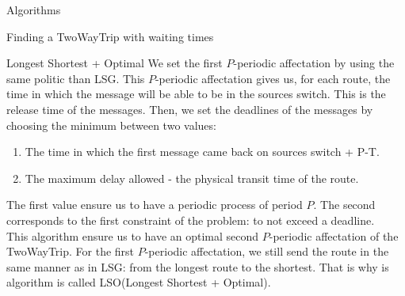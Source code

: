 \documentclass[a4paper,10pt]{report}
\begin{document}
\begin{chapter}{Algorithms}
\begin{section}{Finding a TwoWayTrip with waiting times}
\begin{subsection}{Longest Shortest + Optimal}
We set the first $P$-periodic affectation by using the same politic than LSG. This $P$-periodic affectation gives us, for each route, the time in which the message will be able to be in the sources switch. This is the release time of the messages. Then, we set the deadlines of the messages by choosing the minimum between two values: 
\begin{enumerate}
 \item The time in which the first message came back on sources switch + P-T.
 \item The maximum delay allowed - the physical transit time of the route.
\end{enumerate}

The first value ensure us to have a periodic process of period $P$. The second corresponds to the first constraint of the problem: to not exceed a deadline.\\
This algorithm ensure us to have an optimal second $P$-periodic affectation of the TwoWayTrip. For the first $P$-periodic affectation, we still send the route in the same manner as in LSG: from the longest route to the shortest. That is why is algorithm is called LSO(Longest Shortest + Optimal).


\end{subsection}

\end{section}

\end{chapter}
\end{document}
